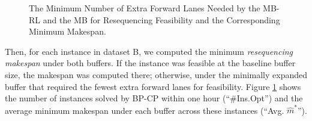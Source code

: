 \documentclass[12pt]{article}
\begin{document}
\begin{figure}[htbp]
    \caption{The Minimum Number of Extra Forward Lanes Needed by the MB-RL and the MB for Resequencing Feasibility and the Corresponding Minimum Makespan. \label{fig4}}

\end{figure}


Then, for each instance in dataset B, we computed the minimum \textit{resequencing makespan} under both buffers. If the instance was feasible at the baseline buffer size, the makespan was computed there; otherwise, under the minimally expanded buffer that required the fewest extra forward lanes for feasibility. Figure \ref{fig4} shows the number of instances solved by BP-CP within one hour (``\#Ins.Opt'') and the average minimum makespan under each buffer across these instances (``Avg. $\widehat{m}^*$'').

\vspace{-1mm}





\end{document}

